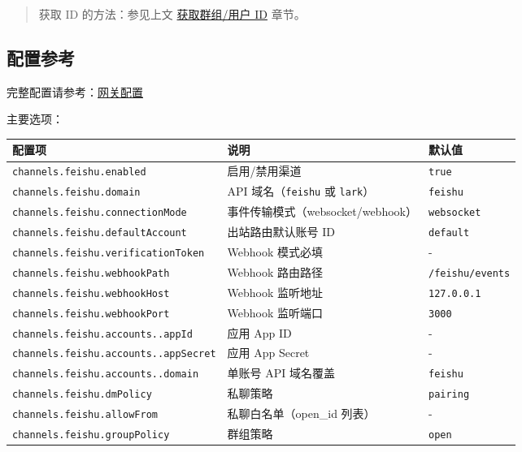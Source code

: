 \begin{quote}
获取 ID 的方法：参见上文 \href{\#获取群组用户-id}{获取群组/用户 ID} 章节。
\end{quote}


\hrulefill


\subsection{配置参考}


完整配置请参考：\href{/gateway/configuration}{网关配置}

主要选项：


\begin{table}[h]
\centering
\small
\begin{tabular}{|l|l|l|}
\hline
配置项 & 说明 & 默认值 \\
\hline
\texttt{channels.feishu.enabled} & 启用/禁用渠道 & \texttt{true} \\
\hline
\texttt{channels.feishu.domain} & API 域名（\texttt{feishu} 或 \texttt{lark}） & \texttt{feishu} \\
\hline
\texttt{channels.feishu.connectionMode} & 事件传输模式（websocket/webhook） & \texttt{websocket} \\
\hline
\texttt{channels.feishu.defaultAccount} & 出站路由默认账号 ID & \texttt{default} \\
\hline
\texttt{channels.feishu.verificationToken} & Webhook 模式必填 & - \\
\hline
\texttt{channels.feishu.webhookPath} & Webhook 路由路径 & \texttt{/feishu/events} \\
\hline
\texttt{channels.feishu.webhookHost} & Webhook 监听地址 & \texttt{127.0.0.1} \\
\hline
\texttt{channels.feishu.webhookPort} & Webhook 监听端口 & \texttt{3000} \\
\hline
\texttt{channels.feishu.accounts..appId} & 应用 App ID & - \\
\hline
\texttt{channels.feishu.accounts..appSecret} & 应用 App Secret & - \\
\hline
\texttt{channels.feishu.accounts..domain} & 单账号 API 域名覆盖 & \texttt{feishu} \\
\hline
\texttt{channels.feishu.dmPolicy} & 私聊策略 & \texttt{pairing} \\
\hline
\texttt{channels.feishu.allowFrom} & 私聊白名单（open\_id 列表） & - \\
\hline
\texttt{channels.feishu.groupPolicy} & 群组策略 & \texttt{open} \\

\end{tabular}
\end{table}
